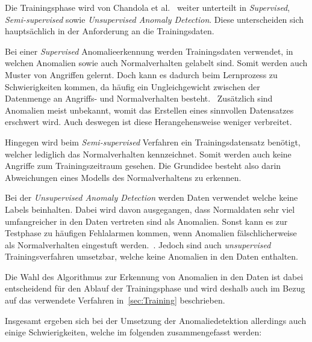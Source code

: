                 Die Trainingsphase wird von Chandola et al.~\cite{ANOMALYSURVEY} weiter unterteilt in \textit{Supervised},
                \textit{Semi-supervised} sowie \textit{Unsupervised Anomaly Detection}.
                Diese unterscheiden sich hauptsächlich in der Anforderung an die Trainingsdaten. 
                
                Bei einer \textit{Supervised} Anomalieerkennung werden Trainingsdaten verwendet, in welchen Anomalien sowie auch Normalverhalten gelabelt sind.
                Somit werden auch Muster von Angriffen gelernt.
                Doch kann es dadurch beim Lernprozess zu Schwierigkeiten kommen, da häufig ein Ungleichgewicht zwischen der Datenmenge an Angriffs- und Normalverhalten besteht.~\cite{IMBALANCEPHUA2004}
                Zusätzlich sind Anomalien meist unbekannt, womit das Erstellen eines sinnvollen Datensatzes erschwert wird.
                Auch deswegen ist diese Herangehensweise weniger verbreitet.~\cite{UNSUPERVISEDGOLDSTEIN2016}

                
                Hingegen wird beim \textit{Semi-supervised} Verfahren ein Trainingsdatensatz benötigt, welcher lediglich das Normalverhalten kennzeichnet.
                Somit werden auch keine Angriffe zum Trainingszeitraum gesehen.
                Die Grundidee besteht also darin Abweichungen eines Modells des Normalverhaltens zu erkennen.
            
                
                Bei der \textit{Unsupervised Anomaly Detection} werden Daten verwendet welche keine Labels beinhalten.
                Dabei wird davon ausgegangen, dass Normaldaten sehr viel umfangreicher in den Daten vertreten sind als Anomalien.
                Sonst kann es zur Testphase zu häufigen Fehlalarmen kommen, wenn Anomalien fälschlicherweise als Normalverhalten eingestuft werden.~\cite{ANOMALYSURVEY2}.
                Jedoch sind auch \textit{unsupervised} Trainingsverfahren umsetzbar, welche keine Anomalien in den Daten enthalten.\cite{UNSUPERVISEDGOLDSTEIN2016}

                Die Wahl des Algorithmus zur Erkennung von Anomalien in den Daten ist dabei entscheidend für den Ablauf der Trainingsphase und wird deshalb auch im Bezug auf das verwendete Verfahren in~\autoref{sec:Training} beschrieben.

                Insgesamt ergeben sich bei der Umsetzung der Anomaliedetektion allerdings auch einige Schwierigkeiten, welche im folgenden zusammengefasst werden:

